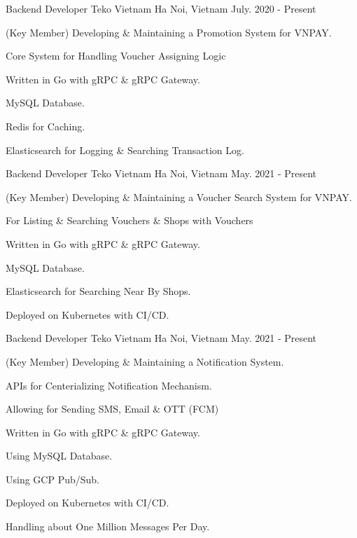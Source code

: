 \begin{cventries}

\cventry
{Backend Developer} %
{Teko Vietnam} %
{Ha Noi, Vietnam} %
{July. 2020 - Present} %
{ %
\begin{cvitems}
\item{(Key Member) Developing \& Maintaining a Promotion System for VNPAY.}
\item{Core System for Handling Voucher Assigning Logic}
\item{Written in Go with gRPC \& gRPC Gateway.}
\item{MySQL Database.}
\item{Redis for Caching.}
\item{Elasticsearch for Logging \& Searching Transaction Log.}
\end{cvitems}
}


\cventry
{Backend Developer} %
{Teko Vietnam} %
{Ha Noi, Vietnam} %
{May. 2021 - Present} %
{ %
\begin{cvitems}
\item{(Key Member) Developing \& Maintaining a Voucher Search System for VNPAY.}
\item{For Listing \& Searching Vouchers \& Shops with Vouchers}
\item{Written in Go with gRPC \& gRPC Gateway.}
\item{MySQL Database.}
\item{Elasticsearch for Searching Near By Shops.}
\item{Deployed on Kubernetes with CI/CD.}
\end{cvitems}
}


\cventry
{Backend Developer} %
{Teko Vietnam} %
{Ha Noi, Vietnam} %
{May. 2021 - Present} %
{ %
\begin{cvitems}
\item{(Key Member) Developing \& Maintaining a Notification System.}
\item{APIs for Centerializing Notification Mechanism.}
\item{Allowing for Sending SMS, Email \& OTT (FCM)}
\item{Written in Go with gRPC \& gRPC Gateway.}
\item{Using MySQL Database.}
\item{Using GCP Pub/Sub.}
\item{Deployed on Kubernetes with CI/CD.}
\item{Handling about One Million Messages Per Day.}
\end{cvitems}
}


\end{cventries}
